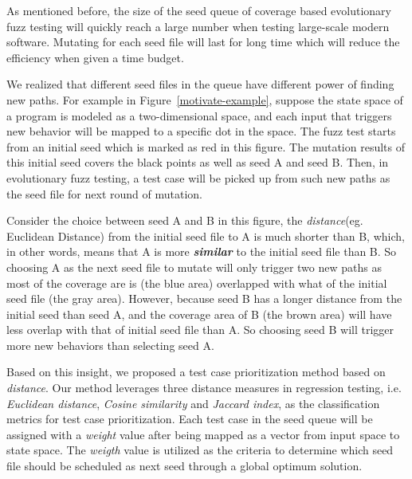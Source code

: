 
As mentioned before, the size of the seed queue of coverage based evolutionary fuzz testing will quickly reach a large number when testing large-scale modern software. Mutating for each seed file will last for long time which will reduce the efficiency when given a time budget. 

We realized that different seed files in the queue have different power of finding new paths. For example in Figure~\ref{motivate-example}, suppose the state space of a program is modeled as a two-dimensional space, and each input that triggers new behavior will be mapped to a specific dot in the space. The fuzz test starts from an initial seed which is marked as red in this figure. The mutation results of this initial seed covers the black points as well as seed A and seed B. Then, in evolutionary fuzz testing, a test case will be picked up from such new paths as the seed file for next round of mutation. 

Consider the choice between seed A and B in this figure, the \emph{distance}(eg. Euclidean Distance) from the initial seed file to A is much shorter than B, which, in other words, means that A is more \textbf{\textit{similar}} to the initial seed file than B. So choosing A as the next seed file to mutate will only trigger two new paths as most of the coverage are is (the blue area) overlapped with what of the initial seed file (the gray area). However, because seed B has a longer distance from the initial seed than seed A, and the coverage area of B (the brown area) will have less overlap with that of initial seed file than A. So choosing seed B will trigger more new behaviors than selecting seed A.


Based on this insight, we proposed a test case prioritization method based on \emph{distance}. Our method leverages three distance measures in regression testing, i.e. \textit{Euclidean distance}, \textit{Cosine similarity} and \textit{Jaccard index}, as the classification metrics for test case prioritization. Each test case in the seed queue will be assigned with a \emph{weight} value after being mapped as a vector from input space to state space. The \emph{weigth} value is utilized as the criteria to determine which seed file should be scheduled as next seed through a global optimum solution.


